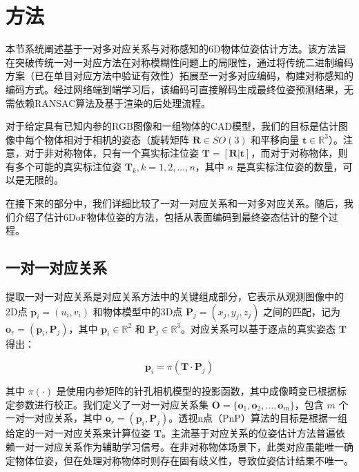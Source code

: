 \section{方法}

\par 本节系统阐述基于一对多对应关系与对称感知的6D物体位姿估计方法。该方法旨在突破传统一对一对应方法在对称模糊性问题上的局限性，通过将传统二进制编码方案（已在单目对应方法中验证有效性\cite{2024hipose, su2022zebrapose}）拓展至一对多对应编码，构建对称感知的编码方式。经过网络端到端学习后，该编码可直接解码生成最终位姿预测结果，无需依赖RANSAC算法及基于渲染的后处理流程。

\par 对于给定具有已知内参的RGB图像和一组物体的CAD模型，我们的目标是估计图像中每个物体相对于相机的姿态（旋转矩阵 $\mathbf{R} \in SO(3)$ 和平移向量 $\mathbf{t} \in \mathbb{R}^3$）。注意，对于非对称物体，只有一个真实标注位姿 $\mathbf{T}=[\mathbf{R}|\mathbf{t}]$，而对于对称物体，则有多个可能的真实标注位姿 $\mathbf{T}_k, k=1, 2,...,n$，其中 $n$ 是真实标注位姿的数量，可以是无限的。

\par 在接下来的部分中，我们详细比较了一对一对应关系和一对多对应关系。随后，我们介绍了估计6DoF物体位姿的方法，包括从表面编码到最终姿态估计的整个过程。

\subsection{一对一对应关系}

提取一对一对应关系是对应关系方法中的关键组成部分，它表示从观测图像中的2D点 $\mathbf{p}_i=(u_i,v_i)$ 和物体模型中的3D点 $\mathbf{P}_j=(x_j,y_j,z_j)$ 之间的匹配，记为 $\mathbf{o}_r = (\mathbf{p}_i, \mathbf{P}_j)$，其中 $\mathbf{p}_i\in \mathbb{R}^2$ 和 $\mathbf{P}_j\in \mathbb{R}^3$。对应关系可以基于逐点的真实姿态 $\mathbf{T}$ 得出：

\begin{equation}
        \mathbf{p}_i=\pi(\mathbf{T}\cdot \mathbf{P}_j) 
        \label{eq:projection}
\end{equation}

其中 $\pi(\cdot)$ 是使用内参矩阵的针孔相机模型的投影函数，其中成像畸变已根据标定参数进行校正。我们定义了一对一对应关系集 $\mathbf{O} = \{\mathbf{o}_1, \mathbf{o}_2, ..., \mathbf{o}_m\}$，包含 $m$ 个一对一对应关系，其中 $\mathbf{o}_r = (\mathbf{p}_i, \mathbf{P}_j)$。透视n点（PnP）算法的目标是根据一组给定的一对一对应关系来计算位姿 $\mathbf{T}$。主流基于对应关系的位姿估计方法普遍依赖一对一对应关系作为辅助学习信号。在非对称物体场景下，此类对应虽能唯一确定物体位姿，但在处理对称物体时则存在固有歧义性，导致位姿估计结果不唯一。

